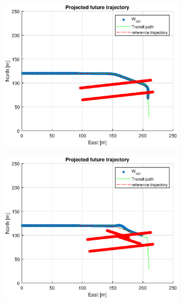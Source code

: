 \begin{figure}
\begin{subfigure}[b]{0.499\textwidth}
    \end{subfigure}
    \hfill
    \\
    \begin{subfigure}[b]{0.49\textwidth}
        \centering
        \includegraphics[width=\textwidth]{Images/Figures/Havn1/Simple1_f999_Frame3}
    \end{subfigure}
    \hfill
    \begin{subfigure}[b]{0.499\textwidth}
        \centering
        \includegraphics[width=\textwidth]{Images/Figures/Havn1/Simple1_f999_Frame5}

\end{subfigure}
\end{figure}
